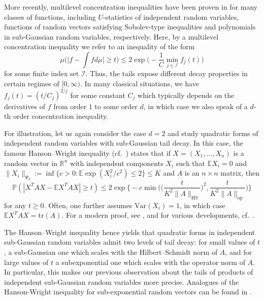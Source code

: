 \documentclass[a4paper,12pt]{amsart}
\numberwithin{equation}{section}
\theoremstyle{remark}
\def\E{{\mathbb E}}
\def\P{{\mathbb P}}
\def\R{{\mathbb R}}
\begin{document}
More recently, multilevel concentration inequalities have been proven in \cite{Ada06,Wol13,AW15} for many classes of functions, including $U$-statistics of independent random variables, functions of random vectors satisfying Sobolev-type inequalities and polynomials in sub-Gaussian random variables, respectively. Here, by a multilevel concentration inequality we refer to an inequality of the form
\[
\mu\Big( \Big|f - \int fd\mu\Big| \ge t \Big) \le 2 \exp\Big( - \frac{1}{C} \min_{j \in \mathcal{I}} f_j(t) \Big)
\]
for some finite index set $\mathcal{I}$. Thus, the tails expose different decay properties in certain regimes of $[0,\infty)$. In many classical situations, we have $f_j(t) = (t/C_j)^{2/j}$ for some constant $C_j$ which typically depends on the derivatives of $f$ from order $1$ to some order $d$, in which case we also speak of a $d$-th order concentration inequality.

For illustration, let us again consider the case $d=2$ and study quadratic forms of independent random variables with sub-Gaussian tail decay. In this case, the famous Hanson--Wright inequality (cf.\ \cite{HW71,Wri73}) states that if $X=(X_1, \ldots,X_n)$ is a random vector in $\R^n$ with independent components $X_i$ such that $\E X_i=0$ and $\lVert X_i \rVert_{\Psi_2} := \inf \{c > 0 \colon \E \exp(X_i^2/c^2) \le 2\} \le K$ and $A$ is an $n \times n$ matrix, then
\begin{equation}\label{eq:HWI}
\P(|X^TAX - \E X^TAX| \ge t) \le 2\exp\Big\{-c\min \Big(\Big(\frac{t}{K^2\lVert A \rVert_\mathrm{HS}}\Big)^2, \frac{t}{K^2\lVert A \rVert_\mathrm{op}}\Big)\Big\}
\end{equation}
for any $t \ge 0$. Often, one further assumes $\mathrm{Var}(X_i)=1$, in which case $\E X^TAX = \mathrm{tr}(A)$. For a modern proof, see \cite{RV13}, and for various developments, cf.\ \cite{HKZ12,VW15,Ada15,ALM18}.

The Hanson--Wright inequality hence yields that quadratic forms in independent sub-Gaussian random variables admit two levels of tail decay: for small values of $t$, a sub-Gaussian one which scales with the Hilbert--Schmidt norm of $A$, and for large values of $t$ a subexponential one which scales with the operator norm of $A$. In particular, this makes our previous observation about the tails of products of independent sub-Gaussian random variables more precise. Analogues of the Hanson-Wright inequality for sub-exponential random vectors can be found in \cite{GSS21b, Sam23}.
\end{document}
